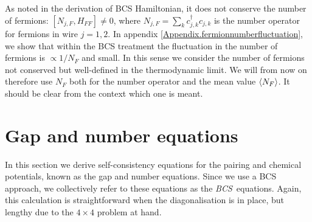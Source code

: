 As noted in the derivation of BCS Hamiltonian, it does not conserve the number of fermions: $[N_{j,F}, H_{FF}] \neq 0 $, where $N_{j,F} = \sum_k c^\dagger_{j,k} c_{j,k}$ is the number operator for fermions in wire $j = 1, 2$. In appendix \ref{Appendix.fermionnumberfluctuation}, we show that within the BCS treatment the fluctuation in the number of fermions is $\propto 1 / N_F$ and small. In this sense we consider the number of fermions not conserved but well-defined in the thermodynamic limit. We will from now on therefore use $N_F$ both for the number operator and the mean value $\braket{N_F}$. It should be clear from the context which one is meant.

\section{Gap and number equations} \label{sec.gapandnumberequations}
In this section we derive self-consistency equations for the pairing and chemical potentials, known as the gap and number equations. Since we use a BCS approach, we collectively refer to these equations as the \textit{BCS} equations. Again, this calculation is straightforward when the diagonalisation is in place, but lengthy due to the $4 \times 4$ problem at hand. 

